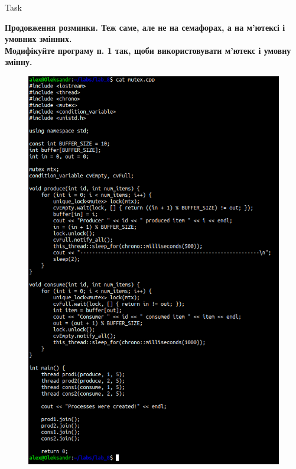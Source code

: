 \documentclass[a4paper,12pt]{article}
\newcommand{\RomanNumeralCaps}[1]{\MakeUppercase{\romannumeral #1}}
\begin{document}
\newpage
    \begin{center}
        \Large{Task \RomanNumeralCaps{2}}
    \end{center}
    \textbf{Продовження розминки. Теж саме, але не на семафорах, а на м’ютексі і умовних змінних. \\
    Модифікуйте програму п. 1 так, щоби використовувати м’ютекс і умовну змінну.}
    \begin{figure}[h!]
        \begin{minipage}[h]{1\linewidth}
            \centering
            \includegraphics[width=0.8\linewidth]{Prt sc/Figure_2_1.png}  
        \end{minipage}
    \end{figure}
\end{document}
